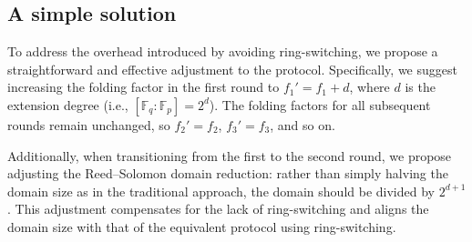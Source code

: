 \documentclass{article}
\newcommand{\Fp}{\mathbb F_p}
\newcommand{\Fq}{\mathbb F_q}
\begin{document}
\subsection{A simple solution}






To address the overhead introduced by avoiding ring-switching, we propose a straightforward and effective adjustment to the protocol. Specifically, we suggest increasing the folding factor in the first round to $f_1' = f_1 + d$, where $d$ is the extension degree (i.e., $[\Fq : \Fp] = 2^d$). The folding factors for all subsequent rounds remain unchanged, so $f_2' = f_2$, $f_3' = f_3$, and so on.

Additionally, when transitioning from the first to the second round, we propose adjusting the Reed–Solomon domain reduction: rather than simply halving the domain size as in the traditional approach, the domain should be divided by $2^{d + 1}$. This adjustment compensates for the lack of ring-switching and aligns the domain size with that of the equivalent protocol using ring-switching.
\end{document}
